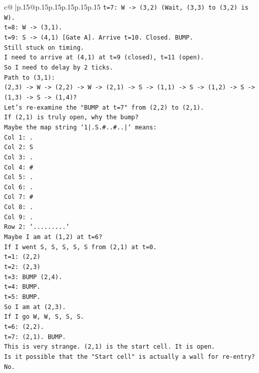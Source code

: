 \documentclass{article}
\begin{document}
{\begin{supertabular}{c@{$\;$}|p{.15\linewidth}@{}p{.15\linewidth}p{.15\linewidth}p{.15\linewidth}p{.15\linewidth}p{.15\linewidth}}
{{{\texttt{t=7: W {-}> (3,2) (Wait, (3,3) to (3,2) is W).} \\
\texttt{t=8: W {-}> (3,1).} \\
\texttt{t=9: S {-}> (4,1) {[}Gate A{]}. Arrive t=10. Closed. BUMP.} \\
\texttt{Still stuck on timing.} \\
\texttt{I need to arrive at (4,1) at t=9 (closed), t=11 (open).} \\
\texttt{So I need to delay by 2 ticks.} \\
\texttt{Path to (3,1):} \\
\texttt{(2,3) {-}> W {-}> (2,2) {-}> W {-}> (2,1) {-}> S {-}> (1,1) {-}> S {-}> (1,2) {-}> S {-}> (1,3) {-}> S {-}> (1,4)?} \\
\texttt{Let's re{-}examine the "BUMP at t=7" from (2,2) to (2,1).} \\
\texttt{If (2,1) is truly open, why the bump?} \\
\texttt{Maybe the map string `1|.S.\#..\#..|` means:} \\
\texttt{Col 1: .} \\
\texttt{Col 2: S} \\
\texttt{Col 3: .} \\
\texttt{Col 4: \#} \\
\texttt{Col 5: .} \\
\texttt{Col 6: .} \\
\texttt{Col 7: \#} \\
\texttt{Col 8: .} \\
\texttt{Col 9: .} \\
\texttt{Row 2: `.........`} \\
\texttt{Maybe I am at (1,2) at t=6?} \\
\texttt{If I went S, S, S, S, S from (2,1) at t=0.} \\
\texttt{t=1: (2,2)} \\
\texttt{t=2: (2,3)} \\
\texttt{t=3: BUMP (2,4).} \\
\texttt{t=4: BUMP.} \\
\texttt{t=5: BUMP.} \\
\texttt{So I am at (2,3).} \\
\texttt{If I go W, W, S, S, S.} \\
\texttt{t=6: (2,2).} \\
\texttt{t=7: (2,1). BUMP.} \\
\texttt{This is very strange. (2,1) is the start cell. It is open.} \\
\texttt{Is it possible that the "Start cell" is actually a wall for re{-}entry? No.} \\
}}}
\end{supertabular}}
\end{document}

